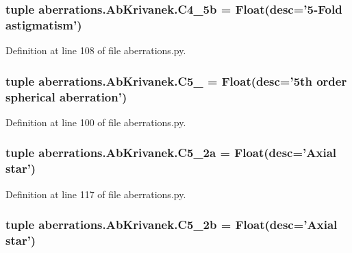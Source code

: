\hypertarget{classaberrations_1_1_ab_krivanek_a4498d2f076a44b05635c92dd234c9940}{
\subsubsection[{C4\-\_\-5b}]{\setlength{\rightskip}{0pt plus 5cm}tuple aberrations.\-Ab\-Krivanek.\-C4\-\_\-5b = Float(desc='5-\/Fold astigmatism')\hspace{0.3cm}{\ttfamily [static]}}}\label{classaberrations_1_1_ab_krivanek_a4498d2f076a44b05635c92dd234c9940}


Definition at line 108 of file aberrations.\-py.

\hypertarget{classaberrations_1_1_ab_krivanek_aed991b8cfb36ae34e5adbbab09854888}{
\subsubsection[{C5\-\_\-0}]{\setlength{\rightskip}{0pt plus 5cm}tuple aberrations.\-Ab\-Krivanek.\-C5\-\_ = Float(desc='5th order spherical aberration')\hspace{0.3cm}{\ttfamily [static]}}}\label{classaberrations_1_1_ab_krivanek_aed991b8cfb36ae34e5adbbab09854888}


Definition at line 100 of file aberrations.\-py.

\hypertarget{classaberrations_1_1_ab_krivanek_a1d76afe5495f60132fab0f7465737b0c}{
\subsubsection[{C5\-\_\-2a}]{\setlength{\rightskip}{0pt plus 5cm}tuple aberrations.\-Ab\-Krivanek.\-C5\-\_\-2a = Float(desc='Axial star')\hspace{0.3cm}{\ttfamily [static]}}}\label{classaberrations_1_1_ab_krivanek_a1d76afe5495f60132fab0f7465737b0c}


Definition at line 117 of file aberrations.\-py.

\hypertarget{classaberrations_1_1_ab_krivanek_a34039ce0ac088661a604adaea5cb80b3}{
\subsubsection[{C5\-\_\-2b}]{\setlength{\rightskip}{0pt plus 5cm}tuple aberrations.\-Ab\-Krivanek.\-C5\-\_\-2b = Float(desc='Axial star')\hspace{0.3cm}{\ttfamily [static]}}}\label{classaberrations_1_1_ab_krivanek_a34039ce0ac088661a604adaea5cb80b3}


